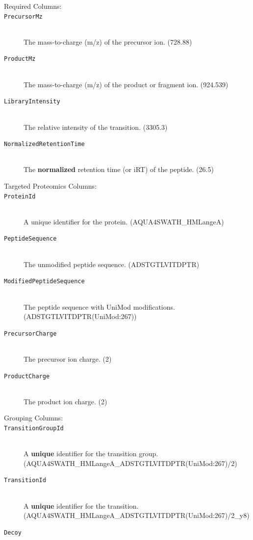 \begin{description}
  \item[Required Columns:]
  \item[\texttt{PrecursorMz}] \hfill \\
  The mass-to-charge (m/z) of the precursor ion. (728.88)
  \item[\texttt{ProductMz}] \hfill \\
  The mass-to-charge (m/z) of the product or fragment ion. (924.539)
   \item[\texttt{LibraryIntensity}] \hfill \\
  The relative intensity of the transition. (3305.3)
  \item[\texttt{NormalizedRetentionTime}] \hfill \\
  The \textbf{normalized} retention time (or iRT) \cite{Escher2012Using} of the peptide. (26.5)
  \newline
  \item[Targeted Proteomics Columns:]
  \item[\texttt{ProteinId}] \hfill \\
  A unique identifier for the protein. (AQUA4SWATH\_HMLangeA)
  \item[\texttt{PeptideSequence}] \hfill \\
  The unmodified peptide sequence. (ADSTGTLVITDPTR)
  \item[\texttt{ModifiedPeptideSequence}] \hfill \\
  The peptide sequence with UniMod modifications. (ADSTGTLVITDPTR(UniMod:267))
  \item[\texttt{PrecursorCharge}] \hfill \\
  The precursor ion charge. (2)
  \item[\texttt{ProductCharge}] \hfill \\
  The product ion charge. (2)
  \newline
  \item[Grouping Columns:]
  \item[\texttt{TransitionGroupId}] \hfill \\
  A \textbf{unique} identifier for the transition group.\\
  (AQUA4SWATH\_HMLangeA\_ADSTGTLVITDPTR(UniMod:267)/2)
  \item[\texttt{TransitionId}] \hfill \\
  A \textbf{unique} identifier for the transition.\\
  (AQUA4SWATH\_HMLangeA\_ADSTGTLVITDPTR(UniMod:267)/2\_y8)
  \item[\texttt{Decoy}] \hfill \\

\end{description}

